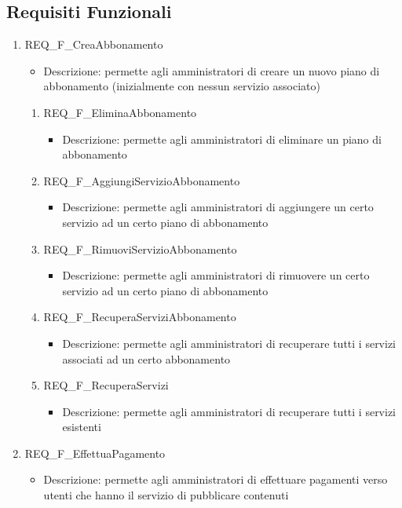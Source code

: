 

\subsection{Requisiti Funzionali}
\begin{enumerate}
	

	\item REQ\_F\_CreaAbbonamento
		\begin{itemize}	
			\item Descrizione: permette agli amministratori di creare un nuovo piano di abbonamento (inizialmente con nessun servizio associato)
		\end{itemize}
		\begin{enumerate}[label*=\arabic*.]      
			\item REQ\_F\_EliminaAbbonamento
			\begin{itemize}	
				\item Descrizione: permette agli amministratori di eliminare un piano di abbonamento
			\end{itemize}
			
			\item REQ\_F\_AggiungiServizioAbbonamento
			\begin{itemize}	
				\item Descrizione: permette agli amministratori di aggiungere un certo servizio ad un certo piano di abbonamento
			\end{itemize}
	
			\item REQ\_F\_RimuoviServizioAbbonamento
			\begin{itemize}	
				\item Descrizione: permette agli amministratori di rimuovere un certo servizio ad un certo piano di abbonamento
			\end{itemize}

			\item REQ\_F\_RecuperaServiziAbbonamento
			\begin{itemize}	
				\item Descrizione: permette agli amministratori di recuperare tutti i servizi associati ad un certo abbonamento
			\end{itemize}
	
			\item REQ\_F\_RecuperaServizi
			\begin{itemize}	
				\item Descrizione: permette agli amministratori di recuperare tutti i servizi esistenti
			\end{itemize}
		\end{enumerate}
	\item REQ\_F\_EffettuaPagamento
		\begin{itemize}	
			\item Descrizione: permette agli amministratori di effettuare pagamenti verso utenti che hanno il servizio di pubblicare contenuti
		\end{itemize}


\end{enumerate}
